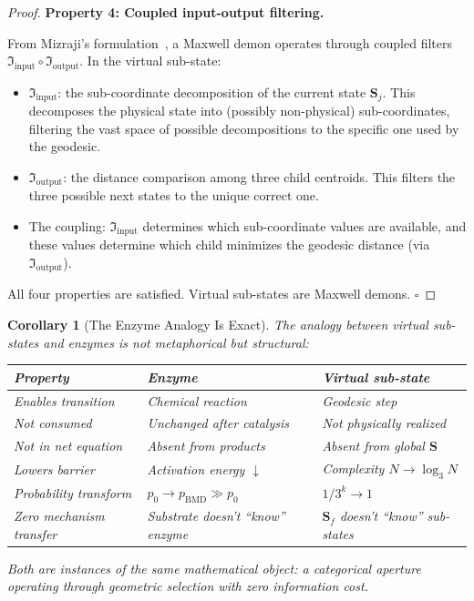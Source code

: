 \documentclass[12pt,twocolumn]{article}
\newtheorem{corollary}[theorem]{Corollary}
\begin{document}
\begin{proof}
\textbf{Property 4: Coupled input-output filtering.}

From Mizraji's formulation~\cite{mizraji2021biological}, a Maxwell demon operates through coupled filters $\Im_{\text{input}} \circ \Im_{\text{output}}$. In the virtual sub-state:
\begin{itemize}
\item $\Im_{\text{input}}$: the sub-coordinate decomposition of the current state $\mathbf{S}_j$. This decomposes the physical state into (possibly non-physical) sub-coordinates, filtering the vast space of possible decompositions to the specific one used by the geodesic.
\item $\Im_{\text{output}}$: the distance comparison among three child centroids. This filters the three possible next states to the unique correct one.
\item The coupling: $\Im_{\text{input}}$ determines which sub-coordinate values are available, and these values determine which child minimizes the geodesic distance (via $\Im_{\text{output}}$).
\end{itemize}

All four properties are satisfied. Virtual sub-states are Maxwell demons. $\square$
\end{proof}

\begin{corollary}[The Enzyme Analogy Is Exact]
\label{cor:enzyme}
The analogy between virtual sub-states and enzymes is not metaphorical but structural:
\begin{center}
\begin{tabular}{lll}
\toprule
Property & Enzyme & Virtual sub-state \\
\midrule
Enables transition & Chemical reaction & Geodesic step \\
Not consumed & Unchanged after catalysis & Not physically realized \\
Not in net equation & Absent from products & Absent from global $\mathbf{S}$ \\
Lowers barrier & Activation energy $\downarrow$ & Complexity $N \to \log_3 N$ \\
Probability transform & $p_0 \to p_{\text{BMD}} \gg p_0$ & $1/3^k \to 1$ \\
Zero mechanism transfer & Substrate doesn't ``know'' enzyme & $\mathbf{S}_f$ doesn't ``know'' sub-states \\
\bottomrule
\end{tabular}
\end{center}
Both are instances of the same mathematical object: a categorical aperture operating through geometric selection with zero information cost.
\end{corollary}
\end{document}
